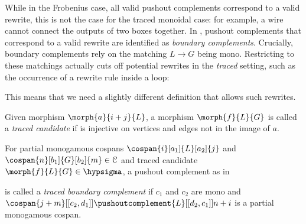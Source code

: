 While in the Frobenius case, all valid pushout complements correspond to a valid
rewrite, this is not the case for the traced monoidal case: for example, a wire
cannot connect the outputs of two boxes together.
In \cite{bonchi2021string}, pushout complements that correspond to a valid
rewrite are identified as \emph{boundary complements}.
Crucially, boundary complements rely on the matching \(L \to G\) being mono.
Restricting to these matchings actually cuts off potential rewrites in the
\emph{traced} setting, such as the occurrence of a rewrite rule inside a loop:
\begin{center}
\end{center}
This means that we need a slightly different definition that allows such
rewrites.

\begin{definition}
    Given morphism \(\morph{a}{i + j}{L}\), a morphism \(\morph{f}{L}{G}\) is
    called a \emph{traced candidate} if is injective on vertices and edges not
    in the image of \(a\).
\end{definition}

\begin{definition}
    \label{def:traced-boundary-complement}
    For partial monogamous cospans \(
        \cospan{i}[a_1]{L}[a_2]{j}
    \) and \(
        \cospan{n}[b_1]{G}[b_2]{m} \in \mathcal{C}
    \) and traced candidate \(
        \morph{f}{L}{G} \in \hypsigma
    \), a pushout complement as in
    \begin{center}
        
    \end{center}
    is called a \emph{traced boundary complement} if \(c_1\) and \(c_2\) are
    mono and \(
        \cospan{j+m}[[c_2,d_1]]{\pushoutcomplement{L}}[[d_2,c_1]]{{n+i}}
    \) is a partial monogamous cospan.
\end{definition}

